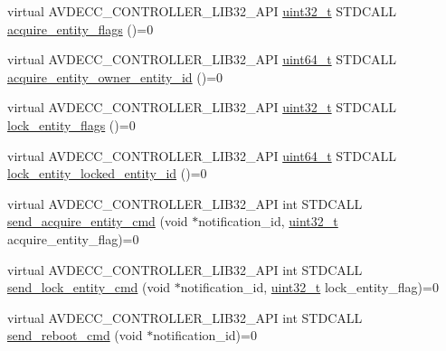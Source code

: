 \begin{DoxyCompactItemize}
\item 
virtual A\+V\+D\+E\+C\+C\+\_\+\+C\+O\+N\+T\+R\+O\+L\+L\+E\+R\+\_\+\+L\+I\+B32\+\_\+\+A\+PI \hyperlink{parse_8c_a6eb1e68cc391dd753bc8ce896dbb8315}{uint32\+\_\+t} S\+T\+D\+C\+A\+LL \hyperlink{classavdecc__lib_1_1descriptor__base_a42f2a796375edd05c8d29856c018042d}{acquire\+\_\+entity\+\_\+flags} ()=0
\item 
virtual A\+V\+D\+E\+C\+C\+\_\+\+C\+O\+N\+T\+R\+O\+L\+L\+E\+R\+\_\+\+L\+I\+B32\+\_\+\+A\+PI \hyperlink{parse_8c_aec6fcb673ff035718c238c8c9d544c47}{uint64\+\_\+t} S\+T\+D\+C\+A\+LL \hyperlink{classavdecc__lib_1_1descriptor__base_a6480d803970d505ce7a9b429a6eb71bd}{acquire\+\_\+entity\+\_\+owner\+\_\+entity\+\_\+id} ()=0
\item 
virtual A\+V\+D\+E\+C\+C\+\_\+\+C\+O\+N\+T\+R\+O\+L\+L\+E\+R\+\_\+\+L\+I\+B32\+\_\+\+A\+PI \hyperlink{parse_8c_a6eb1e68cc391dd753bc8ce896dbb8315}{uint32\+\_\+t} S\+T\+D\+C\+A\+LL \hyperlink{classavdecc__lib_1_1descriptor__base_a757e66272bba4c52cefa914df8c60bb5}{lock\+\_\+entity\+\_\+flags} ()=0
\item 
virtual A\+V\+D\+E\+C\+C\+\_\+\+C\+O\+N\+T\+R\+O\+L\+L\+E\+R\+\_\+\+L\+I\+B32\+\_\+\+A\+PI \hyperlink{parse_8c_aec6fcb673ff035718c238c8c9d544c47}{uint64\+\_\+t} S\+T\+D\+C\+A\+LL \hyperlink{classavdecc__lib_1_1descriptor__base_a052b47529d0e60ca87894159fcb65e14}{lock\+\_\+entity\+\_\+locked\+\_\+entity\+\_\+id} ()=0
\item 
virtual A\+V\+D\+E\+C\+C\+\_\+\+C\+O\+N\+T\+R\+O\+L\+L\+E\+R\+\_\+\+L\+I\+B32\+\_\+\+A\+PI int S\+T\+D\+C\+A\+LL \hyperlink{classavdecc__lib_1_1descriptor__base_adfd0cf2a51bff7d762b0efc743480c48}{send\+\_\+acquire\+\_\+entity\+\_\+cmd} (void $\ast$notification\+\_\+id, \hyperlink{parse_8c_a6eb1e68cc391dd753bc8ce896dbb8315}{uint32\+\_\+t} acquire\+\_\+entity\+\_\+flag)=0
\item 
virtual A\+V\+D\+E\+C\+C\+\_\+\+C\+O\+N\+T\+R\+O\+L\+L\+E\+R\+\_\+\+L\+I\+B32\+\_\+\+A\+PI int S\+T\+D\+C\+A\+LL \hyperlink{classavdecc__lib_1_1descriptor__base_a1ac1f5c700f4eebd37b7c45498b36bbc}{send\+\_\+lock\+\_\+entity\+\_\+cmd} (void $\ast$notification\+\_\+id, \hyperlink{parse_8c_a6eb1e68cc391dd753bc8ce896dbb8315}{uint32\+\_\+t} lock\+\_\+entity\+\_\+flag)=0
\item 
virtual A\+V\+D\+E\+C\+C\+\_\+\+C\+O\+N\+T\+R\+O\+L\+L\+E\+R\+\_\+\+L\+I\+B32\+\_\+\+A\+PI int S\+T\+D\+C\+A\+LL \hyperlink{classavdecc__lib_1_1descriptor__base_a1618412a9b3d57a12044030b31cfd5a3}{send\+\_\+reboot\+\_\+cmd} (void $\ast$notification\+\_\+id)=0
\item 

\end{DoxyCompactItemize}
